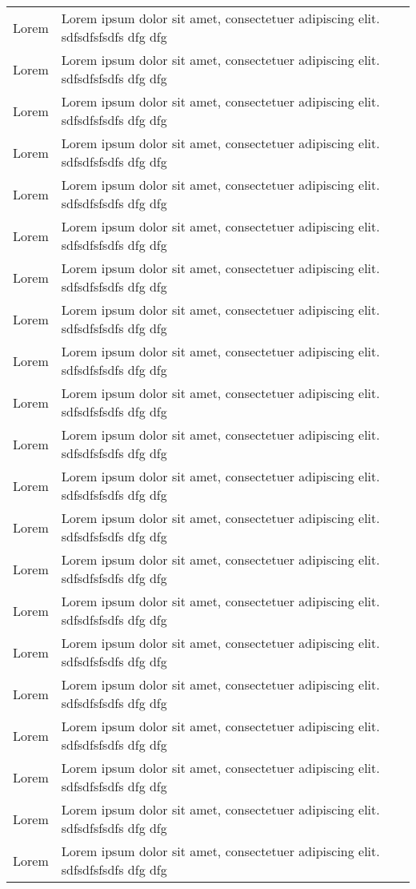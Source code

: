 \begin{longtable}{|>{\footnotesize\setlength\hsize{.5\hsize}}X|>{\footnotesize\setlength\hsize{1.5\hsize}}X|}
Lorem & Lorem ipsum dolor sit amet, consectetuer adipiscing elit. sdfsdfsfsdfs dfg dfg\\
Lorem & Lorem ipsum dolor sit amet, consectetuer adipiscing elit. sdfsdfsfsdfs dfg dfg\\
Lorem & Lorem ipsum dolor sit amet, consectetuer adipiscing elit. sdfsdfsfsdfs dfg dfg\\
Lorem & Lorem ipsum dolor sit amet, consectetuer adipiscing elit. sdfsdfsfsdfs dfg dfg\\
Lorem & Lorem ipsum dolor sit amet, consectetuer adipiscing elit. sdfsdfsfsdfs dfg dfg\\
Lorem & Lorem ipsum dolor sit amet, consectetuer adipiscing elit. sdfsdfsfsdfs dfg dfg\\
Lorem & Lorem ipsum dolor sit amet, consectetuer adipiscing elit. sdfsdfsfsdfs dfg dfg\\
Lorem & Lorem ipsum dolor sit amet, consectetuer adipiscing elit. sdfsdfsfsdfs dfg dfg\\
Lorem & Lorem ipsum dolor sit amet, consectetuer adipiscing elit. sdfsdfsfsdfs dfg dfg\\
Lorem & Lorem ipsum dolor sit amet, consectetuer adipiscing elit. sdfsdfsfsdfs dfg dfg\\
Lorem & Lorem ipsum dolor sit amet, consectetuer adipiscing elit. sdfsdfsfsdfs dfg dfg\\
Lorem & Lorem ipsum dolor sit amet, consectetuer adipiscing elit. sdfsdfsfsdfs dfg dfg\\
Lorem & Lorem ipsum dolor sit amet, consectetuer adipiscing elit. sdfsdfsfsdfs dfg dfg\\
Lorem & Lorem ipsum dolor sit amet, consectetuer adipiscing elit. sdfsdfsfsdfs dfg dfg\\
Lorem & Lorem ipsum dolor sit amet, consectetuer adipiscing elit. sdfsdfsfsdfs dfg dfg\\
Lorem & Lorem ipsum dolor sit amet, consectetuer adipiscing elit. sdfsdfsfsdfs dfg dfg\\
Lorem & Lorem ipsum dolor sit amet, consectetuer adipiscing elit. sdfsdfsfsdfs dfg dfg\\
Lorem & Lorem ipsum dolor sit amet, consectetuer adipiscing elit. sdfsdfsfsdfs dfg dfg\\
Lorem & Lorem ipsum dolor sit amet, consectetuer adipiscing elit. sdfsdfsfsdfs dfg dfg\\
Lorem & Lorem ipsum dolor sit amet, consectetuer adipiscing elit. sdfsdfsfsdfs dfg dfg\\
Lorem & Lorem ipsum dolor sit amet, consectetuer adipiscing elit. sdfsdfsfsdfs dfg dfg\\

\end{longtable}
